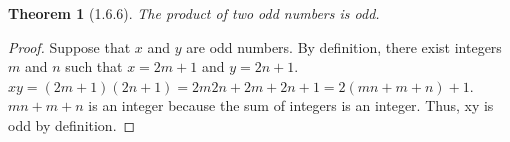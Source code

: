 \documentclass[a4paper, 12pt]{article}
\theoremstyle{plain}
\newtheorem*{theorem*}{Theorem}
\begin{document}
	
	\begin{theorem*}[1.6.6]
		The product of two odd numbers is odd.
	\end{theorem*}
	
	\begin{proof}
		Suppose that $x$ and $y$ are odd numbers. By definition, there exist integers $m$ and $n$ such that $x = 2m + 1$ and $y = 2n + 1$. $xy = (2m + 1)(2n + 1) = 2m2n + 2m + 2n + 1 = 2(mn + m + n) + 1$. $mn + m + n$ is an integer because the sum of integers is an integer. Thus, xy is odd by definition.
	\end{proof}
\end{document}
